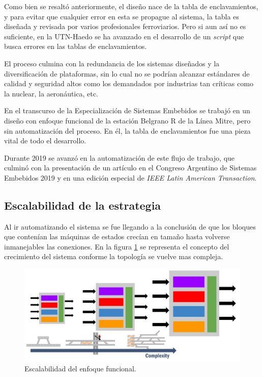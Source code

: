 		Como bien se resaltó anteriormente, el diseño nace de la tabla de enclavamientos, y para evitar que cualquier error en esta se propague al sistema, la tabla es diseñada y revisada por varios profesionales ferroviarios. Pero si aun así no es suficiente, en la UTN-Haedo se ha avanzado en el desarrollo de un \textit{script} que busca errores en las tablas de enclavamientos.
		
		El proceso culmina con la redundancia de los sistemas diseñados y la diversificación de plataformas, sin lo cual no se podrían alcanzar estándares de calidad y seguridad altos como los demandados por industrias tan críticas como la nuclear, la aeronáutica, etc. 
		
		En el transcurso de la Especialización de Sistemas Embebidos se trabajó en un diseño con enfoque funcional de la estación Belgrano R de la Línea Mitre, pero sin automatización del proceso. En él, la tabla de enclavamientos fue una pieza vital de todo el desarrollo.
		
		Durante 2019 se avanzó en la automatización de este flujo de trabajo, que culminó con la presentación de un artículo en el Congreso Argentino de Sistemas Embebidos 2019 y en una edición especial de \textit{IEEE Latin American Transaction}.
		
	\subsection{Escalabilidad de la estrategia}	
		
		Al ir automatizando el sistema se fue llegando a la conclusión de que los bloques que contenían las máquinas de estados crecían en tamaño hasta volverse inmanejables las conexiones. En la figura \ref{fig:Escala_Funcional} se representa el concepto del crecimiento del sistema conforme la topología se vuelve mas compleja.		
					
		\begin{figure}[h]
		\centering
			\includegraphics[scale=.4]{./Figures/Funcional_complejidad}
			\caption{Escalabilidad del enfoque funcional.}
			\label{fig:Escala_Funcional}
		\end{figure}
		
